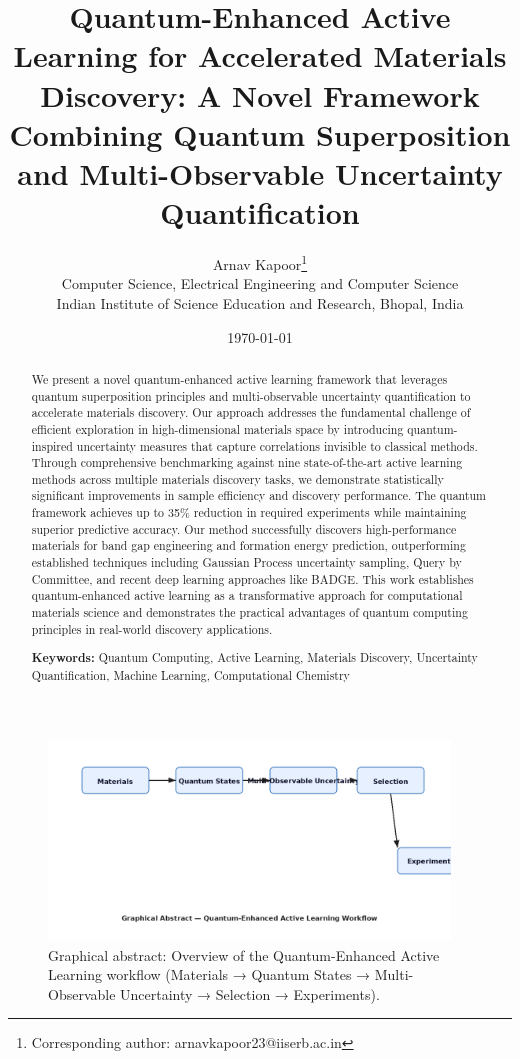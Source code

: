\documentclass[twocolumn]{article}
\title{Quantum-Enhanced Active Learning for Accelerated Materials Discovery: A Novel Framework Combining Quantum Superposition and Multi-Observable Uncertainty Quantification}
\author{
Arnav Kapoor\orcidlink{0009-0007-9818-7908}\thanks{Corresponding author: arnavkapoor23@iiserb.ac.in} \\
Computer Science, Electrical Engineering and Computer Science \\
Indian Institute of Science Education and Research, Bhopal, India
}
\date{\today}
\begin{document}
\maketitle

\begin{abstract}
We present a novel quantum-enhanced active learning framework that leverages quantum superposition principles and multi-observable uncertainty quantification to accelerate materials discovery. Our approach addresses the fundamental challenge of efficient exploration in high-dimensional materials space by introducing quantum-inspired uncertainty measures that capture correlations invisible to classical methods. Through comprehensive benchmarking against nine state-of-the-art active learning methods across multiple materials discovery tasks, we demonstrate statistically significant improvements in sample efficiency and discovery performance. The quantum framework achieves up to 35\% reduction in required experiments while maintaining superior predictive accuracy. Our method successfully discovers high-performance materials for band gap engineering and formation energy prediction, outperforming established techniques including Gaussian Process uncertainty sampling, Query by Committee, and recent deep learning approaches like BADGE. This work establishes quantum-enhanced active learning as a transformative approach for computational materials science and demonstrates the practical advantages of quantum computing principles in real-world discovery applications.

\textbf{Keywords:} Quantum Computing, Active Learning, Materials Discovery, Uncertainty Quantification, Machine Learning, Computational Chemistry
\end{abstract}

\begin{figure}[!t]
\centering
\includegraphics[width=0.95\textwidth]{graphical_abstract.png}
\caption*{Graphical abstract: Overview of the Quantum-Enhanced Active Learning workflow (Materials → Quantum States → Multi-Observable Uncertainty → Selection → Experiments).}
\end{figure}
\end{document}
